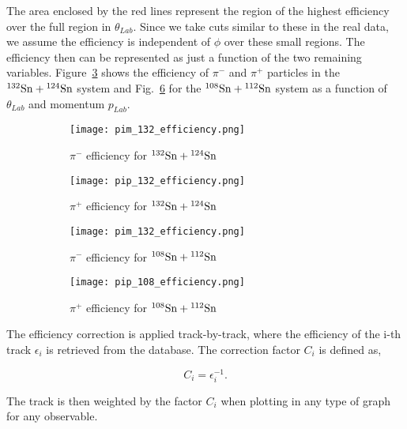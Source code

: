 The area enclosed by the red lines represent the region of the highest efficiency over the full region in $\theta_{Lab}$.  Since we take cuts similar to these in the real data, we assume the efficiency is independent of $\phi$ over these small regions. The efficiency then can be represented as just a function of the two remaining variables. Figure~\ref{fig:132_eff} shows the efficiency of $\pi^-$ and $\pi^+$ particles in the ${}^{132}\mathrm{Sn} + {}^{124}\mathrm{Sn}$ system and Fig.~\ref{fig:108_eff} for the ${}^{108}\mathrm{Sn} + {}^{112}\mathrm{Sn}$ system as a function of $\theta_{Lab}$ and momentum $p_{Lab}$. 



\begin{figure}[!htb]
    \centering
    \begin{subfigure}[t]{0.49\textwidth}
        \centering
        \texttt{[image: pim\_132\_efficiency.png]}
        \caption{$\pi^-$ efficiency for ${}^{132}\mathrm{Sn} + {}^{124}\mathrm{Sn}$} \label{fig:pim_132_eff}
    \end{subfigure}
    \hfill
    \begin{subfigure}[t]{.49\textwidth}
        \centering
        \texttt{[image: pip\_132\_efficiency.png]} 
        \caption{$\pi^+$ efficiency for ${}^{132}\mathrm{Sn} + {}^{124}\mathrm{Sn}$} \label{fig:pip_132_eff}
    \end{subfigure}
  
    \caption{ }
\label{fig:132_eff}
\end{figure}



\begin{figure}[!htb]
    \centering
    \begin{subfigure}[t]{0.49\textwidth}
        \centering
        \texttt{[image: pim\_132\_efficiency.png]}
        \caption{$\pi^-$ efficiency for ${}^{108}\mathrm{Sn} + {}^{112}\mathrm{Sn}$} \label{fig:pim_108_eff}
    \end{subfigure}
    \hfill
    \begin{subfigure}[t]{.49\textwidth}
        \centering
        \texttt{[image: pip\_108\_efficiency.png]} 
        \caption{$\pi^+$ efficiency for ${}^{108}\mathrm{Sn} + {}^{112}\mathrm{Sn}$} \label{fig:pip_108_eff}
    \end{subfigure}
  
    \caption{ }
\label{fig:108_eff}
\end{figure}

The efficiency correction is applied track-by-track, where the efficiency of the i-th track $\epsilon_i$ is retrieved from the database. The correction factor $C_i$ is defined as,

\begin{equation}
C_i = \epsilon_i^{-1}.
\end{equation}

The track is then weighted by the factor $C_i$ when plotting in any type of graph for any observable. 